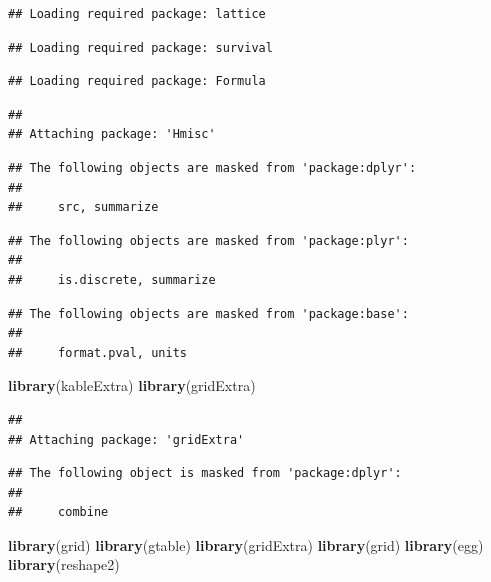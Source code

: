 \documentclass[11pt,]{article}
\newenvironment{Shaded}{\begin{snugshade}}{\end{snugshade}}
\newcommand{\KeywordTok}[1]{\textcolor[rgb]{0.13,0.29,0.53}{\textbf{#1}}}
\newcommand{\NormalTok}[1]{#1}
\begin{document}
\begin{verbatim}
## Loading required package: lattice
\end{verbatim}

\begin{verbatim}
## Loading required package: survival
\end{verbatim}

\begin{verbatim}
## Loading required package: Formula
\end{verbatim}

\begin{verbatim}
## 
## Attaching package: 'Hmisc'
\end{verbatim}

\begin{verbatim}
## The following objects are masked from 'package:dplyr':
## 
##     src, summarize
\end{verbatim}

\begin{verbatim}
## The following objects are masked from 'package:plyr':
## 
##     is.discrete, summarize
\end{verbatim}

\begin{verbatim}
## The following objects are masked from 'package:base':
## 
##     format.pval, units
\end{verbatim}

\begin{Shaded}
\begin{Highlighting}[]
\KeywordTok{library}\NormalTok{(kableExtra)}
\KeywordTok{library}\NormalTok{(gridExtra)}
\end{Highlighting}
\end{Shaded}

\begin{verbatim}
## 
## Attaching package: 'gridExtra'
\end{verbatim}

\begin{verbatim}
## The following object is masked from 'package:dplyr':
## 
##     combine
\end{verbatim}

\begin{Shaded}
\begin{Highlighting}[]
\KeywordTok{library}\NormalTok{(grid)}
\KeywordTok{library}\NormalTok{(gtable)}
\KeywordTok{library}\NormalTok{(gridExtra)}
\KeywordTok{library}\NormalTok{(grid)}
\KeywordTok{library}\NormalTok{(egg)}
\KeywordTok{library}\NormalTok{(reshape2)}
\end{Highlighting}
\end{Shaded}
\end{document}
